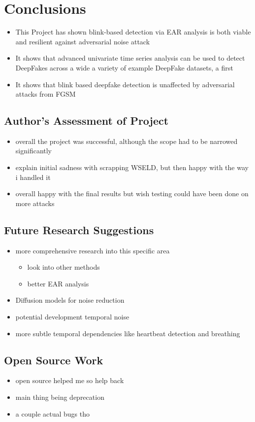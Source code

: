 \chapter{Conclusions}
\label{ch:conclusions}

\begin{itemize}
    \item This Project has shown blink-based detection via EAR analysis is both viable and resilient against adversarial noise attack
    \item It shows that advanced univariate time series analysis can be used to detect DeepFakes across a wide a variety of example DeepFake datasets, a first
    \item It shows that blink based deepfake detection is unaffected by adversarial attacks from FGSM
\end{itemize}

\section{Author's Assessment of Project}

\begin{itemize}
    \item overall the project was successful, although the scope had to be narrowed significantly
    \item explain initial sadness with scrapping WSELD, but then happy with the way i handled it
    \item overall happy with the final results but wish testing could have been done on more attacks
\end{itemize}

\section{Future Research Suggestions}

\begin{itemize}
    \item more comprehensive research into this specific area
    \begin{itemize}
        \item look into other methods
        \item better EAR analysis
    \end{itemize}
    \item Diffusion models for noise reduction
    \item potential development temporal noise
    \item more subtle temporal dependencies like heartbeat detection and breathing
\end{itemize}

\section{Open Source Work}

\begin{itemize}
    \item open source helped me so help back
    \item main thing being deprecation
    \item a couple actual bugs tho
\end{itemize}